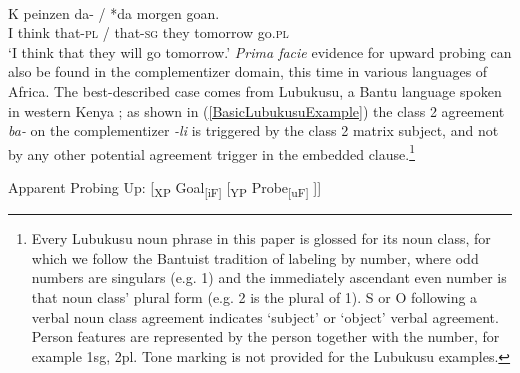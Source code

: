\documentclass[output=paper
,modfonts
,nonflat
]{langsci/langscibook}
\begin{document}
\ea \label{WestFlemFirstExample}
 \\
\gll K peinzen 	da- /   *da\circled{-\O}        	 	morgen 	goan. \\
I think that-\textsc{pl} / that-\textsc{sg} they tomorrow go.\textsc{pl} \\
\glt `I think that they will go tomorrow.' 	
\z						
\noindent \textit{Prima facie} evidence for upward probing can also be found in the complementizer domain, this time in various languages of Africa. The best-described case comes from Lubukusu, a Bantu language spoken in western Kenya \citep{Diercks:2010,Diercks:2013,Wasike:2007}; as shown in (\ref{BasicLubukusuExample}) the class 2 agreement \textit{ba-} on the complementizer \textit{-li} is triggered by the class 2 matrix subject, and not by any other potential agreement trigger in the embedded clause.\footnote{
	Every Lubukusu noun phrase in this paper is glossed for its noun class, for which we follow the Bantuist tradition of labeling by number, where odd numbers are singulars (e.g. 1) and the immediately ascendant even number is that noun class’ plural form (e.g. 2 is the plural of 1).  S or O following a verbal noun class agreement indicates ‘subject’ or ‘object’ verbal agreement.  Person features are represented by the person together with the number, for example 1sg, 2pl. Tone marking is not provided for the Lubukusu examples.}

\ea \label{ProbingUpSchematic}
Apparent Probing Up: [\textsubscript{XP} Goal\textsubscript{[iF]} [\textsubscript{YP} Probe\textsubscript{[uF]} ]]
\z
\end{document}
